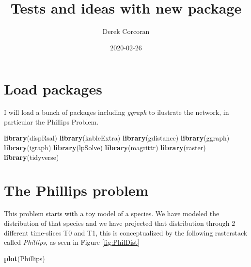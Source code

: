 \documentclass[]{article}
\title{Tests and ideas with new package}
\author{Derek Corcoran}
\date{2020-02-26}
\newenvironment{Shaded}{\begin{snugshade}}{\end{snugshade}}
\newcommand{\KeywordTok}[1]{\textcolor[rgb]{0.13,0.29,0.53}{\textbf{#1}}}
\newcommand{\NormalTok}[1]{#1}
\begin{document}
\maketitle

\hypertarget{load-packages}{%
\section{Load packages}\label{load-packages}}

I will load a bunch of packages including \emph{ggraph} to ilustrate the network, in particular the Phillips Problem.

\begin{Shaded}
\begin{Highlighting}[]
\KeywordTok{library}\NormalTok{(dispRsal)}
\KeywordTok{library}\NormalTok{(kableExtra)}
\KeywordTok{library}\NormalTok{(gdistance)}
\KeywordTok{library}\NormalTok{(ggraph)}
\KeywordTok{library}\NormalTok{(igraph)}
\KeywordTok{library}\NormalTok{(lpSolve)}
\KeywordTok{library}\NormalTok{(magrittr)}
\KeywordTok{library}\NormalTok{(raster)}
\KeywordTok{library}\NormalTok{(tidyverse)}
\end{Highlighting}
\end{Shaded}

\hypertarget{the-phillips-problem}{%
\section{The Phillips problem}\label{the-phillips-problem}}

This problem starts with a toy model of a species. We have modeled the distribution of that species and we have projected that distribution through 2 different time-slices T0 and T1, this is conceptualized by the following rasterstack called \emph{Phillips}, as seen in Figure \ref{fig:PhilDist}

\begin{Shaded}
\begin{Highlighting}[]
\KeywordTok{plot}\NormalTok{(Phillips)}
\end{Highlighting}
\end{Shaded}
\end{document}
